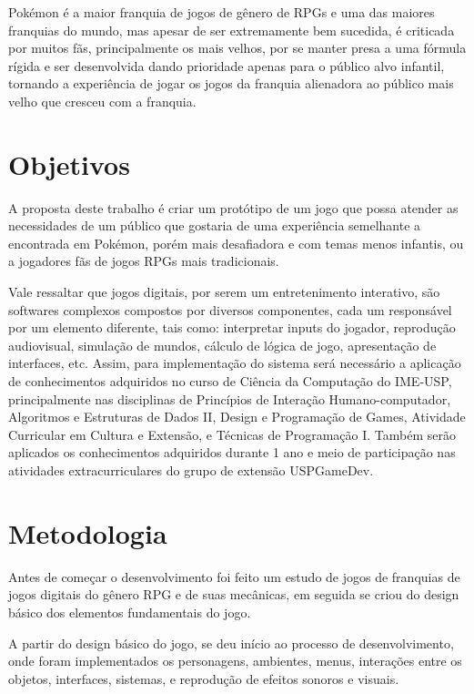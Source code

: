 \documentclass[
	12pt,				%
	openright,			%
	twoside,			%
	a4paper,			%
	english,			%
	french,				%
	spanish,			%
	brazil				%
	]{abntex2}
\begin{document}
Pokémon é a maior franquia de jogos de gênero de RPGs e uma das maiores franquias do mundo, mas apesar de ser extremamente bem sucedida, é criticada por muitos fãs, principalmente os mais velhos, por se manter presa a uma fórmula rígida e ser desenvolvida dando prioridade apenas para o público alvo infantil, tornando a experiência de jogar os jogos da franquia alienadora ao público mais velho que cresceu com a franquia.

\section{Objetivos}

A proposta deste trabalho é criar um protótipo de um jogo que possa atender as necessidades de um público que gostaria de uma experiência semelhante a encontrada em Pokémon, porém mais desafiadora e com temas menos infantis, ou a jogadores fãs de jogos RPGs mais tradicionais.

	Vale ressaltar que jogos digitais, por serem um entretenimento interativo, são softwares complexos compostos por diversos componentes, cada um responsável por um elemento diferente, tais como: interpretar inputs do jogador, reprodução audiovisual, simulação de mundos, cálculo de lógica de jogo, apresentação de interfaces, etc. Assim, para implementação do sistema será necessário a aplicação de conhecimentos adquiridos no curso de Ciência da Computação do IME-USP, principalmente nas disciplinas de Princípios de Interação Humano-computador, Algoritmos e Estruturas de Dados II, Design e Programação de Games, Atividade Curricular em Cultura e Extensão, e Técnicas de Programação I. Também serão aplicados os conhecimentos adquiridos durante 1 ano e meio de participação nas atividades extracurriculares do grupo de extensão USPGameDev.

\section{Metodologia}

Antes de começar o desenvolvimento foi feito um estudo de jogos de franquias de jogos digitais do gênero RPG e de suas mecânicas, em seguida se criou do design básico dos elementos fundamentais do jogo.

	A partir do design básico do jogo, se deu início ao processo de desenvolvimento, onde foram implementados os personagens, ambientes, menus, interações entre os objetos, interfaces, sistemas, e reprodução de efeitos sonoros e visuais.
\end{document}
